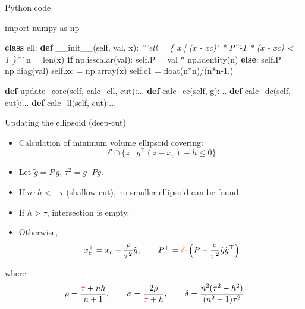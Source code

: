 \documentclass[10pt,ignorenonframetext,serif,onlymath]{beamer}
\newenvironment{Shaded}{}{}
\newcommand{\BuiltInTok}[1]{#1}
\newcommand{\CommentTok}[1]{\textcolor[rgb]{0.38,0.63,0.69}{\textit{#1}}}
\newcommand{\ControlFlowTok}[1]{\textcolor[rgb]{0.00,0.44,0.13}{\textbf{#1}}}
\newcommand{\FloatTok}[1]{\textcolor[rgb]{0.25,0.63,0.44}{#1}}
\newcommand{\FunctionTok}[1]{\textcolor[rgb]{0.02,0.16,0.49}{#1}}
\newcommand{\ImportTok}[1]{#1}
\newcommand{\KeywordTok}[1]{\textcolor[rgb]{0.00,0.44,0.13}{\textbf{#1}}}
\newcommand{\NormalTok}[1]{#1}
\newcommand{\OperatorTok}[1]{\textcolor[rgb]{0.40,0.40,0.40}{#1}}
\newcommand{\VariableTok}[1]{\textcolor[rgb]{0.10,0.09,0.49}{#1}}
\providecommand{\tightlist}{%
  \setlength{\itemsep}{0pt}\setlength{\parskip}{0pt}}
\begin{document}
\begin{frame}[fragile]{Python code}
\protect\hypertarget{python-code}{}

\begin{Shaded}
\begin{Highlighting}[]
\ImportTok{import}\NormalTok{ numpy }\ImportTok{as}\NormalTok{ np}

\KeywordTok{class}\NormalTok{ ell:}
    \KeywordTok{def} \FunctionTok{__init__}\NormalTok{(}\VariableTok{self}\NormalTok{, val, x):}
        \CommentTok{'''ell = \{ x | (x - xc)' * P^-1 * (x - xc) <= 1 \}'''}
\NormalTok{        n }\OperatorTok{=} \BuiltInTok{len}\NormalTok{(x)}
        \ControlFlowTok{if}\NormalTok{ np.isscalar(val):}
            \VariableTok{self}\NormalTok{.P }\OperatorTok{=}\NormalTok{ val }\OperatorTok{*}\NormalTok{ np.identity(n)}
        \ControlFlowTok{else}\NormalTok{:}
            \VariableTok{self}\NormalTok{.P }\OperatorTok{=}\NormalTok{ np.diag(val)}
        \VariableTok{self}\NormalTok{.xc }\OperatorTok{=}\NormalTok{ np.array(x)}
        \VariableTok{self}\NormalTok{.c1 }\OperatorTok{=} \BuiltInTok{float}\NormalTok{(n}\OperatorTok{*}\NormalTok{n)}\OperatorTok{/}\NormalTok{(n}\OperatorTok{*}\NormalTok{n}\FloatTok{-1.}\NormalTok{)}

    \KeywordTok{def}\NormalTok{ update_core(}\VariableTok{self}\NormalTok{, calc_ell, cut):...}
    \KeywordTok{def}\NormalTok{ calc_cc(}\VariableTok{self}\NormalTok{, g):...}
    \KeywordTok{def}\NormalTok{ calc_dc(}\VariableTok{self}\NormalTok{, cut):...}
    \KeywordTok{def}\NormalTok{ calc_ll(}\VariableTok{self}\NormalTok{, cut):...}
\end{Highlighting}
\end{Shaded}

\end{frame}

\begin{frame}{Updating the ellipsoid (deep-cut)}
\protect\hypertarget{updating-the-ellipsoid-deep-cut}{}

\begin{itemize}
\tightlist
\item
  Calculation of minimum volume ellipsoid covering:
  \[\mathcal{E} \cap \{z \mid g^\top (z - x_c) + h \leq 0 \}\]
\item
  Let \(\tilde{g} = P\,g\), \(\tau^2 = g^\top P g\).
\item
  If \(n \cdot h < -\tau\) (shallow cut), no smaller ellipsoid can be
  found.
\item
  If \(h > \tau\), intersection is empty.
\item
  Otherwise, \[x_c^+ = x_c - \frac{\rho}{ \tau^2 } \tilde{g}, \qquad
  P^+ = {\color{orange}\delta\cdot}\left(P - \frac{\sigma}{ \tau^2 } \tilde{g}\tilde{g}^\top\right)\]
\end{itemize}

where \[\rho = \frac{ {\color{red}\tau}+nh}{n+1}, \qquad
  \sigma = \frac{2\rho}{ {\color{red}\tau}+h}, \qquad
  \delta = \frac{n^2(\tau^2 - h^2)}{(n^2 - 1)\tau^2}\]

\end{frame}
\end{document}
